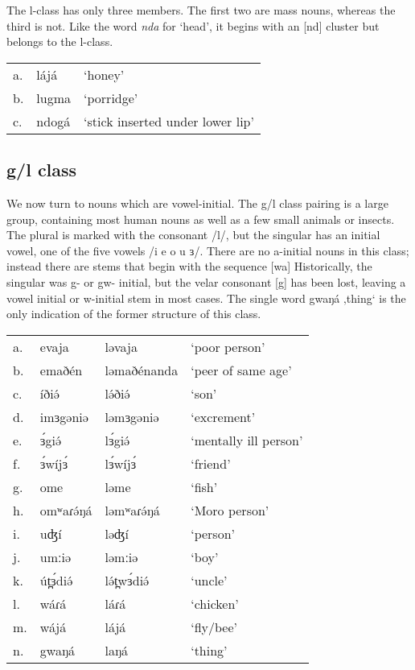 The l-class has only three members. The first two are mass nouns, whereas the third is not. Like the word \textit{nda} for ‘head’, it begins with an [nd] cluster but belongs to the l-class. 

\ea
\begin{tabular}[t]{lll}
a.	&	lájá		&	‘honey’\\
b.	&	lugma		&	‘porridge’\\
c.	&	ndogá		&	‘stick inserted under lower lip’\\
\end{tabular}	
\z

\subsection{g/l class}\label{section:glclass}

We now turn to nouns which are vowel-initial. The g/l class pairing is a large group, containing most human nouns as well as a few small animals or insects. The plural is marked with the consonant /l/, but the singular has an initial vowel, one of the five vowels /i e o u ɜ/. There are no a-initial nouns in this class; instead there are stems that begin with the sequence [wa]  Historically, the singular was g- or gw- initial, but the velar consonant [g] has been lost, leaving a vowel initial or w-initial stem in most cases. The single word gwaŋá ‚thing‘ is the only indication of the former structure of this class. 

\ea
\begin{tabular}[t]{llll}	
a.	&	evaja	&	ləvaja		&	‘poor person’\\
b.	&	emaðén	&	ləmaðénanda	&	‘peer of same age’\\
c.	&	íðiə́		&	lə́ðiə́			&	‘son’\\
d.	&	imɜgəniə&	ləmɜgəniə	&	‘excrement’\\
e.	&	ɜ́giə́		&	lɜ́giə́		&	‘mentally ill person’\\ %
f.	&	ɜ́wíjɜ́	&	lɜ́wíjɜ́		&	‘friend’\\
g.	&	ome		&	ləme			&	‘fish’\\
h.	&	omʷaɾə́ŋá	&	ləmʷaɾə́ŋá	&	‘Moro person’\\
i.	&	uʤí		&	ləʤí		&	‘person’\\
j.	&	umːiə	&	ləmːiə		&	‘boy’\\
k.	&	út̪ɜ́diə́	&	lə́t̪wɜ́diə́		&	‘uncle’\\
l.	&	wáɾá	&	láɾá		&	‘chicken’\\
m.	&	wájá	&	lájá			&	‘fly/bee’ \\
n.	&	gwaŋá	&	laŋá		&	‘thing’\\
\end{tabular}
\z

